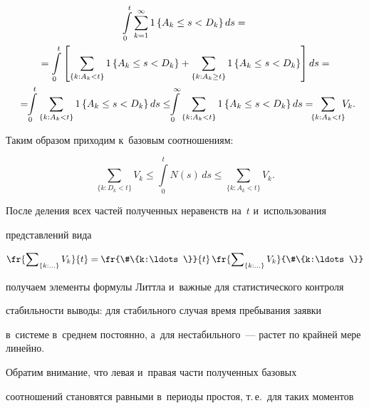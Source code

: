      \begin{multline*}


     \int\limits_0^t \sum\limits^\infty_{k=1} 1\left\{ A_k\leq s<D_k\right\}ds= {}\\


     {}=


     \int\limits_0^t\left[ \sum\limits_{\{k: A_k<t\}} 1\left\{ A_k\leq s<D_k\right\} + 


\sum\limits_{\{k: A_k\geq t\}} 1\left\{ A_k\leq s<D_k\right\} \right] ds={}\\


     {}= \!\!\int\limits_0^t \sum\limits_{\{k: A_k<t\}} 1\left\{ A_k\leq s<D_k\right\} ds 


\leq


     \!\!\int\limits_0^\infty \sum\limits_{\{k: A_k<t\}} 1\left\{ A_k\leq s<D_k\right\} ds 


=\!\!\!\sum\limits_{\{k: A_k<t\}}\!\!\! V_k.\hspace*{-2.42pt}


     \end{multline*}


Таким образом приходим к~базовым соотношениям:


$$


\sum\limits_{\{k: D_k<t\}} V_k\leq \int\limits_0^t N(s)\,ds\leq \sum\limits_{\{k: 


A_k<t\}} V_k.


$$


После деления всех частей полученных неравенств на~$t$ и~использования 


пред\-став\-ле\-ний вида


$$


\fr{\sum\nolimits_{\{k: \ldots\}} V_k}{t}=\fr{\#\{k:\ldots\}}{t}\, 


\fr{\sum\nolimits_{\{k:\ldots\}} V_k}{\#\{k:\ldots\}}


$$


получаем элементы формулы Литтла и~важные для статистического контроля 


стабильности выводы: для стабильного случая время пребывания заявки 


в~сис\-те\-ме в~среднем постоянно, а~для нестабильного~--- растет по крайней мере линейно.





     Обратим внимание, что левая и~правая час\-ти полученных базовых 


соотношений становятся равными в~периоды про\-стоя, т.\,е.\ для таких моментов 


